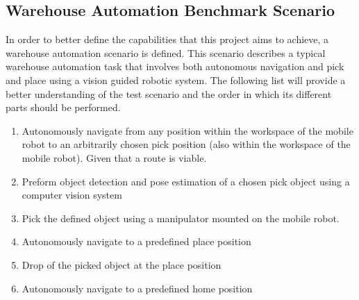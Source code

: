 \subsection{Warehouse Automation Benchmark Scenario} \label{sec:I:O:WarehouseScenario}
In order to better define the capabilities that this project aims to achieve, a warehouse automation scenario is defined. This scenario describes a typical warehouse automation task that involves both autonomous navigation and pick and place using a vision guided robotic system. The following list will provide a better understanding of the test scenario and the order in which its different parts should be performed.
\begin{enumerate}
    \item Autonomously navigate from any position within the workspace of the mobile robot to an arbitrarily chosen pick position (also within the workspace of the mobile robot). Given that a route is viable.
    \item Preform object detection and pose estimation of a chosen pick object using a computer vision system
    \item Pick the defined object using a manipulator mounted on the mobile robot.
    \item Autonomously navigate to a predefined place position
    \item Drop of the picked object at the place position
    \item Autonomously navigate to a predefined home position
\end{enumerate}





